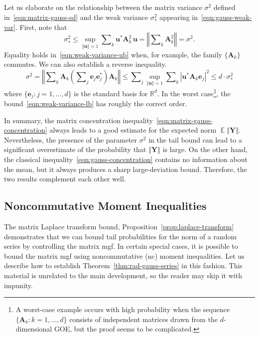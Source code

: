 \documentclass[11pt,letterpaper,twoside,reqno,draft]{amsart}
\theoremstyle{remark}
\numberwithin{equation}{section}
\numberwithin{thm}{section}
\begin{document}
Let us elaborate on the relationship between the matrix variance $\sigma^2$ defined in~\eqref{eqn:matrix-gauss-sd} and the weak variance $\sigma_{*}^2$ appearing in~\eqref{eqn:gauss-weak-var}.  First, note that
\begin{equation} \label{eqn:weak-variance-ub}
\sigma_{*}^2
	\leq \sup_{{\left\Vert {{{\bm{{u}}}}} \right\Vert} = 1} \sum\nolimits_k {\bm{{u}}}^{*} {\bm{{A}}}_k^2 \, {\bm{{u}}}
	= {\left\Vert {{ \sum\nolimits_k {\bm{{A}}}_k^2 }} \right\Vert}
	= \sigma^2.
\end{equation}
Equality holds in~\eqref{eqn:weak-variance-ub} when, for example, the family $\{{\bm{{A}}}_k\}$ commutes.  We can also establish a reverse inequality.
\begin{equation} \label{eqn:weak-variance-lb}
\sigma^2 = {\left\Vert {{ \sum\nolimits_k {\bm{{A}}}_k \left( \sum\nolimits_j {\mathbf{e}}_j {\mathbf{e}}_j^{*} \right) {\bm{{A}}}_k }} \right\Vert}
	\leq \sum\nolimits_j \sup_{{\left\Vert {{{\bm{{u}}}}} \right\Vert} = 1} \sum\nolimits_k
	{{{\left\vert {{{ {\bm{{u}}}^{*} {\bm{{A}}}_k {\mathbf{e}}_j }}} \right\vert}}^2}
	\leq d \cdot \sigma_*^2
\end{equation}
where $\{{\mathbf{e}}_j : j = 1, \dots, d \}$ is the standard basis for ${\mathbb{R}^{{d}}}$.  In the worst case\footnote{A worst-case example occurs with high probability when the sequence $\{ {\bm{{A}}}_k : k = 1, \dots, d \}$ consists of independent matrices drawn from the $d$-dimensional GOE, but the proof seems to be complicated.},
the bound~\eqref{eqn:weak-variance-lb} has roughly the correct order.

In summary, the matrix concentration inequality~\eqref{eqn:matrix-gauss-concentration} always leads to a good estimate for the expected norm ${\operatorname{\mathbb{E}}} {\left\Vert {{ {\bm{{Y}}} }} \right\Vert}$.  Nevertheless, the presence of the parameter $\sigma^2$ in the tail bound can lead to a significant overestimate of the probability that ${\left\Vert {{{\bm{{Y}}}}} \right\Vert}$ is large.  On the other hand, the classical inequality~\eqref{eqn:gauss-concentration} contains no information about the mean, but it always produces a sharp large-deviation bound.  Therefore, the two results complement each other well.

\subsection{Noncommutative Moment Inequalities} \label{sec:nc-moments}

The matrix Laplace transform bound, Proposition~\ref{prop:laplace-transform} demonstrates that we can bound tail probabilities for the norm of a random series by controlling the matrix mgf.
In certain special cases, it is possible to bound the matrix mgf using noncommutative (nc) moment inequalities.  Let us describe how to establish Theorem~\ref{thm:rad-gauss-series} in this fashion.  This material is unrelated to the main development, so the reader may skip it with impunity.  
\end{document}
